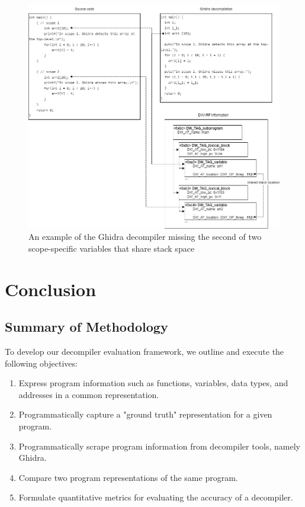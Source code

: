 \begin{figure}[htb]
    \centering
    \includegraphics[width=\textwidth]{./figures/ghidra-miss-scopes.drawio.png}
    \caption{An example of the Ghidra decompiler missing the second of two scope-specific variables that share stack space}
    \label{fig:ghidra-miss-scopes}
\end{figure}

\chapter{Conclusion} \label{sec:conclusion}

\section{Summary of Methodology}

To develop our decompiler evaluation framework, we outline and execute the following objectives:

\begin{enumerate}
    \item Express program information such as functions, variables, data types, and addresses in a common representation.
    \item Programmatically capture a "ground truth" representation for a given program.
    \item Programmatically scrape program information from decompiler tools, namely Ghidra.
    \item Compare two program representations of the same program.
    \item Formulate quantitative metrics for evaluating the accuracy of a decompiler.
\end{enumerate}

